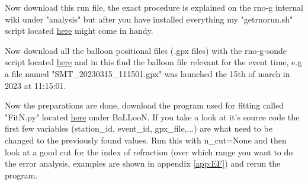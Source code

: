 Now download this run file, the exact procedure is explained on the rno-g
internal wiki under "analysis" but after you have installed everything my
"getrnorun.sh" script located
\href{https://github.com/arthuradriaens-code/Scripts.git}{here} might come in
handy.

Now download all the balloon positional files (.gpx files) with the rno-g-sonde
script located \href{https://github.com/RNO-G/rno-g-sonde.git}{here} and in
this find the balloon file relevant for the event time, e.g a file named
"SMT\_20230315\_111501.gpx" was launched the 15th of march in 2023 at 11:15:01. 

Now the preparations are done, download the program used for fitting called
"FitN.py" located
\href{https://github.com/arthuradriaens-code/projects-mt.git}{here} under
BaLLooN. If you take a look at it's source code the first few variables
(station\_id, event\_id, gpx\_file,...) are what need to be changed to the
previously found values. Run this with n\_cut=None and then look at a good cut
for the index of refraction (over which range you want to do the error
analysis, examples are shown in appendix \ref{app:EF}) and rerun the program.
